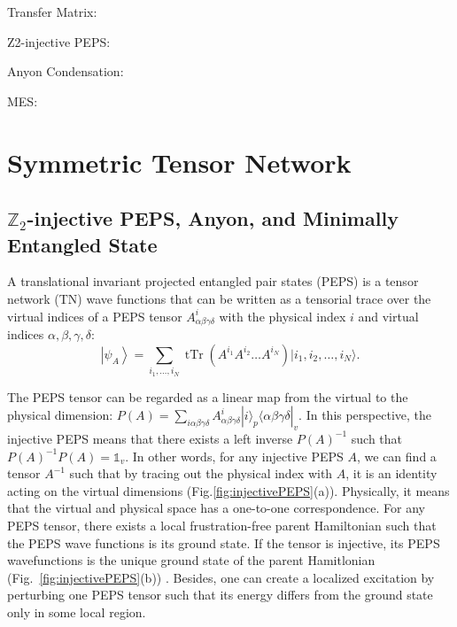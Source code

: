 \documentclass{ntuthesis}
\newcommand{\citep}{\cite}
\begin{document}
Transfer Matrix:
\citep{2015_Zauner,Haegeman_2015,1972_Lieb} 

Z2-injective PEPS:
\citep{2011_Norbert_Ginjective}



Anyon Condensation:
\citep{2009-PRB-Condensate-induced, Norbert_Schuch_2013,Haegeman_2015, 2017_anyon_condensates
, 2017_Z4_anyon, 2017_sym_induced,2018_Chen_Boson_condensation, Zhang_2019}

MES: 
\citep{2012-PRB-Oshikawa-MES}


\chapter{Symmetric Tensor Network}

\section{$\mathbb{Z}_2$-injective PEPS, Anyon, and Minimally Entangled State}
\label{sec:Z2PEPS}

A translational invariant projected entangled pair states (PEPS) \citep{2008_PEPS} is a tensor network (TN) wave functions that can be written as a tensorial trace over the virtual indices of a PEPS tensor $A^i_{\alpha\beta\gamma\delta}$ with the physical index $i$ and virtual indices $\alpha, \beta, \gamma, \delta$:
\begin{equation}
\left|\psi_A\right\rangle=\sum_{i_1,\ldots,i_N} \operatorname{tTr}\left(A^{i_1}A^{i_2}\ldots A^{i_N}\right)|i_1, i_2,\ldots,i_N\rangle.
\end{equation}

The PEPS tensor can be regarded as a linear map from the virtual to the physical dimension: $P(A) = \sum_{i \alpha \beta \gamma \delta} A^i_{\alpha\beta\gamma\delta} |i\rangle_p \langle \alpha\beta\gamma\delta|_v$. 
%
In this perspective, the injective PEPS means that there exists a left inverse $P(A)^{-1}$ such that $P(A)^{-1} P(A) = \mathbb{1}_v$. In other words, for any injective PEPS $A$, we can find a tensor $A^{-1}$ such that  by tracing out the physical index with $A$, it is an identity acting on the virtual dimensions (Fig.\ref{fig:injectivePEPS}(a)). Physically, it means that the virtual and physical space has a one-to-one correspondence. 
%
For any PEPS tensor, there exists a local frustration-free parent Hamiltonian such that the PEPS wave functions is its ground state.
%
If the tensor is injective, its PEPS wavefunctions is the unique ground state of the parent Hamitlonian (Fig.~\ref{fig:injectivePEPS}(b)) \citep{2011_Norbert_Ginjective}. Besides, one can create a localized excitation by perturbing one PEPS tensor such that its energy differs from the ground state only in some local region.
\end{document}
